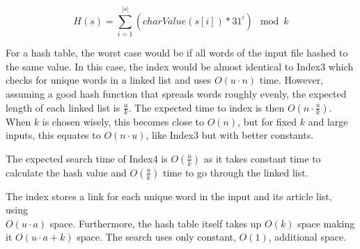 \begin{equation}\label{eq:hashfunc}
    H(s)= \sum_{i=1}^{|s|}\left(charValue(s[i])*31^i\right) \mod k
\end{equation}

For a hash table, the worst case would be if all words of the input file hashed to the same value. In this case, the index would be almost identical to Index3 which checks for unique words in a linked list and uses $O(u\cdot n)$ time. However, assuming a good hash function that spreads words roughly evenly, the expected length of each linked list is $\frac{u}{k}$. The expected time to index is then $O(n\cdot \frac{u}{k})$. When $k$ is chosen wisely, this becomes close to $O(n)$, but for fixed $k$ and large inputs, this equates to $O(n\cdot u)$, like Index3 but with better constants. 

The expected search time of Index4 is $O(\frac{u}{k})$ as it takes constant time to calculate the hash value and $O(\frac{u}{k})$ time to go through the linked list. 

The index stores a link for each unique word in the input and its article list, using \\$O(u\cdot a)$ space. Furthermore, the hash table itself takes up $O(k)$ space making it $O(u\cdot a+k)$ space. The search uses only constant, $O(1)$, additional space. 
